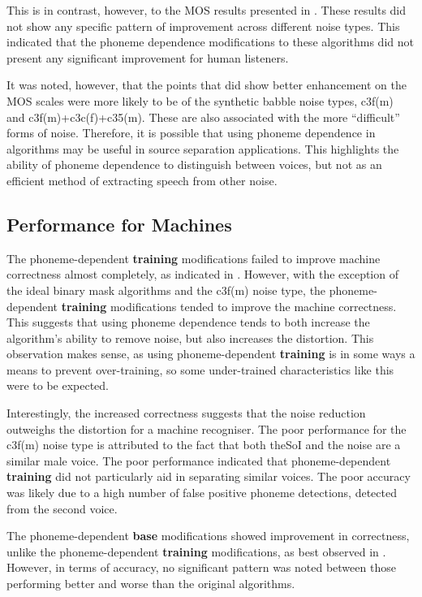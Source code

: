 This is in contrast, however, to the \ac{MOS} results presented in
.
These results did not show any specific pattern of improvement across
different noise types. This indicated that the phoneme dependence
modifications to these algorithms did not present any significant
improvement for human listeners.

It was noted, however, that the points that did show better enhancement
on the \ac{MOS} scales were more likely to be of the synthetic babble
noise types, c3f(m) and c3f(m)+c3c(f)+c35(m). These are also associated
with the more ``difficult'' forms of noise. Therefore, it is possible
that using phoneme dependence in algorithms may be useful in source
separation applications. This highlights the ability of phoneme dependence
to distinguish between voices, but not as an efficient method of extracting
speech from other noise.


\subsection{Performance for Machines}

The phoneme-dependent \textbf{training} modifications failed to improve
machine correctness almost completely, as indicated in .
However, with the exception of the ideal binary mask algorithms and
the c3f(m) noise type, the phoneme-dependent \textbf{training} modifications
tended to improve the machine correctness. This suggests that using
phoneme dependence tends to both increase the algorithm's ability
to remove noise, but also increases the distortion. This observation
makes sense, as using phoneme-dependent \textbf{training} is in some
ways a means to prevent over-training, so some under-trained characteristics
like this were to be expected.

Interestingly, the increased correctness suggests that the noise reduction
outweighs the distortion for a machine recogniser. The poor performance
for the c3f(m) noise type is attributed to the fact that both the\ac{SoI}
and the noise are a similar male voice. The poor performance indicated
that phoneme-dependent \textbf{training} did not particularly aid
in separating similar voices. The poor accuracy was likely due to
a high number of false positive phoneme detections, detected from
the second voice.

The phoneme-dependent \textbf{base} modifications showed improvement
in correctness, unlike the phoneme-dependent \textbf{training} modifications,
as best observed in . However, in
terms of accuracy, no significant pattern was noted between those
performing better and worse than the original algorithms.


